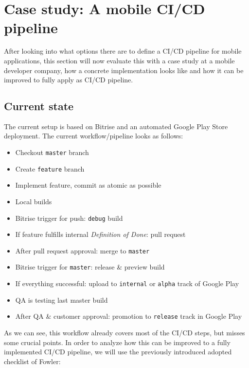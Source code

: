 \section{Case study: A mobile CI/CD pipeline}
After looking into what options there are to define a CI/CD pipeline for mobile applications, this section will now evaluate this with a case study at a mobile developer company, how a concrete implementation looks like and how it can be improved to fully apply as CI/CD pipeline.

\subsection{Current state}
The current setup is based on Bitrise and an automated Google Play Store deployment. The current workflow/pipeline looks as follows:\\

\begin{itemize}
	\item Checkout \texttt{master} branch
	\item Create \texttt{feature} branch
	\item Implement feature, commit as atomic as possible
	\item Local builds
	\item Bitrise trigger for push: \texttt{debug} build
	\item If feature fulfills internal \textit{Definition of Done}: pull request
	\item After pull request approval: merge to \texttt{master}
	\item Bitrise trigger for \texttt{master}: release \& preview build
	\item If everything successful: upload to \texttt{internal} or \texttt{alpha} track of Google Play
	\item QA is testing last master build
	\item After QA \& customer approval: promotion to \texttt{release} track in Google Play\\
\end{itemize}

As we can see, this workflow already covers most of the CI/CD steps, but misses some crucial points. In order to analyze how this can be improved to a fully implemented CI/CD pipeline, we will use the previously introduced adopted checklist of Fowler:\\

